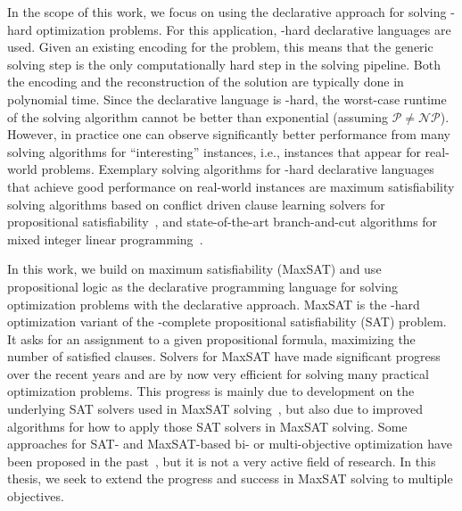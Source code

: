 In the scope of this work, we focus on using the declarative approach for solving \NP-hard optimization problems.
For this application, \NP-hard declarative languages are used.
Given an existing encoding for the problem, this means that the generic solving step is the only computationally hard step in the solving pipeline.
Both the encoding and the reconstruction of the solution are typically done in polynomial time.
Since the declarative language is \NP-hard, the worst-case runtime of the solving algorithm cannot be better than exponential (assuming $\mathcal{P}\neq\mathcal{NP}$).
However, in practice one can observe significantly better performance from many solving algorithms for ``interesting'' instances, i.e., instances that appear for real-world problems.
Exemplary solving algorithms for \NP-hard declarative languages that achieve good performance on real-world instances are maximum satisfiability solving algorithms based on conflict driven clause learning solvers for propositional satisfiability~\autocite{handbook2-cdcl}, and state-of-the-art branch-and-cut algorithms for mixed integer linear programming~\autocite{ChenEtAl2010-branch-and-cut}.

In this work, we build on maximum satisfiability (MaxSAT) and use propositional logic as the declarative programming language for solving optimization problems with the declarative approach.
MaxSAT is the \NP-hard optimization variant of the \NP-complete propositional satisfiability (SAT) problem.
It asks for an assignment to a given propositional formula, maximizing the number of satisfied clauses.
Solvers for MaxSAT have made significant progress over the recent years and are by now very efficient for solving many practical optimization problems.
This progress is mainly due to development on the underlying SAT solvers used in MaxSAT solving~\autocites{DBLP:journals/ai/FroleyksHIJS21,handbook2-cdcl}, but also due to improved algorithms for how to apply those SAT solvers in MaxSAT solving.
Some approaches for SAT- and MaxSAT-based bi- or multi-objective optimization have been proposed in the past~\autocites{DBLP:conf/cp/SohBTB17,DBLP:conf/ijcai/Terra-NevesLM18a,DBLP:conf/aaai/Terra-NevesLM18,DBLP:conf/ijcai/Terra-NevesLM18,DBLP:conf/cp/JanotaMSM21}, but it is not a very active field of research.
In this thesis, we seek to extend the progress and success in MaxSAT solving to multiple objectives.

